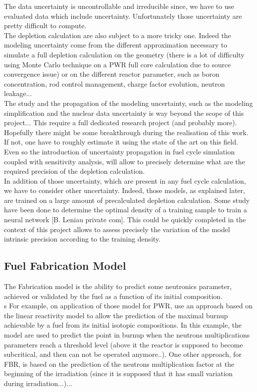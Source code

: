 \documentclass[dvips,12pt]{article}
\begin{document}
The data uncertainty is uncontrollable and irreducible since, we have to use evaluated data which include uncertainty. Unfortunately those uncertainty are pretty difficult to compute. \\
The depletion calculation are also subject to a more tricky one. Indeed the modeling uncertainty come from the different approximation necessary to simulate a full depletion calculation on the geometry (there is a lot of difficulty using Monte Carlo technique on a PWR full core calculation due to source convergence issue) or on the different reactor parameter, such as boron concentration, rod control management, charge factor evolution, neutron leakage...\\
The study and the propagation of the modeling uncertainty, such as the modeling simplification and the nuclear data uncertainty is way beyond the scope of this project... This require a full dedicated research project (and probably more).  Hopefully there might be some breakthrough during the realisation of this work. If not, one have to roughly estimate it using the state of the art on this field. \\
Even so the introduction of uncertainty propagation in fuel cycle simulation coupled with sensitivity analysis, will allow to precisely determine what are the required precision of the depletion calculation.\\

In addition of those uncertainty, which are present in any fuel cycle calculation, we have to consider other uncertainty. Indeed, those models, as explained later, are trained on a large amount of precalculated depletion calculation. Some study have been done to determine the optimal density of a training sample to train a neural network [B. Leniau private com]. This could be quickly completed in the context of this project allows to assess precisely the variation of the model intrinsic precision according to the training density.\\

\subsection{Fuel Fabrication Model}
The Fabrication model is the ability to predict some neutronics parameter, achieved or validated by the fuel as a function of its initial composition.\\s
For example, on application of those model for PWR, use an approach based on the linear reactivity model to allow the prediction of the maximal burnup achievable by a fuel from its initial isotopic compositions. In this example, the model are used to predict the point in burnup when the neutrons multiplications parameters reach a threshold level (above it the reactor is supposed to become subcritical, and then can not be operated anymore..).
One other approach, for FBR, is based on the prediction of the neutrons multiplication factor at the beginning of the irradiation (since it is supposed that it has small variation during irradiation...)... 
\end{document}

